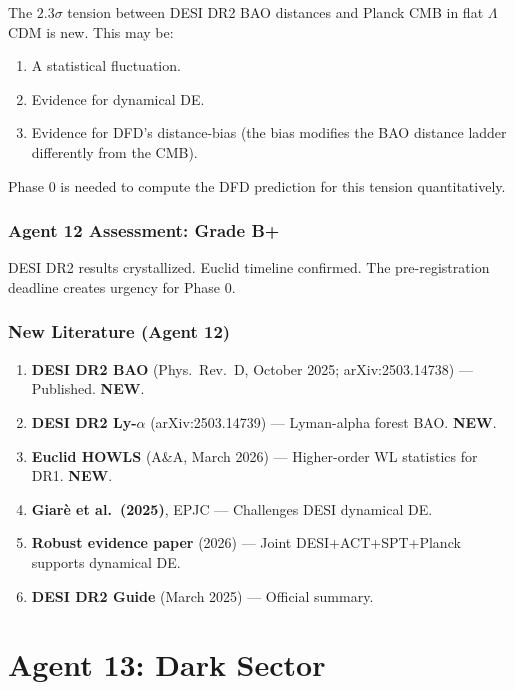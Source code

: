 \documentclass[11pt,a4paper]{article}
\newcommand{\NEW}{\textcolor{dfdblue}{\textbf{NEW}}}
\begin{document}
The $2.3\sigma$ tension between DESI DR2 BAO distances and Planck CMB in flat $\Lambda$CDM is new. This may be:
\begin{enumerate}
\item A statistical fluctuation.
\item Evidence for dynamical DE.
\item Evidence for DFD's distance-bias (the bias modifies the BAO distance ladder differently from the CMB).
\end{enumerate}

Phase 0 is needed to compute the DFD prediction for this tension quantitatively.

\section{Agent 12 Assessment: Grade B+}

DESI DR2 results crystallized. Euclid timeline confirmed. The pre-registration deadline creates urgency for Phase 0.

\section{New Literature (Agent 12)}

\begin{enumerate}
\item \textbf{DESI DR2 BAO} (Phys.\ Rev.\ D, October 2025; arXiv:2503.14738) --- Published. \NEW.
\item \textbf{DESI DR2 Ly-$\alpha$} (arXiv:2503.14739) --- Lyman-alpha forest BAO. \NEW.
\item \textbf{Euclid HOWLS} (A\&A, March 2026) --- Higher-order WL statistics for DR1. \NEW.
\item \textbf{Giar\`e et al.\ (2025)}, EPJC --- Challenges DESI dynamical DE.
\item \textbf{Robust evidence paper} (2026) --- Joint DESI+ACT+SPT+Planck supports dynamical DE.
\item \textbf{DESI DR2 Guide} (March 2025) --- Official summary.
\end{enumerate}


\part{Agent 13: Dark Sector}
\label{part:agent13}
\end{document}
